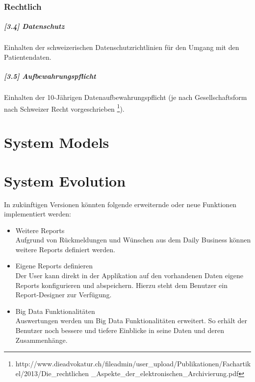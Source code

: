 \documentclass[a4paper]{scrreprt}
\begin{document}
\subsection{Rechtlich}
\paragraph{[3.4] Datenschutz} Einhalten der schweizerischen Datenschutzrichtlinien für den Umgang mit den Patientendaten.

\paragraph{[3.5] Aufbewahrungspflicht} Einhalten der 10-Jährigen Datenaufbewahrungspflicht (je nach Gesellschaftsform nach Schweizer Recht vorgeschrieben \footnote{http://www.dieadvokatur.ch/fileadmin/user\_upload/Publikationen/Fachartikel/2013/Die\_rechtlichen \_Aspekte\_der\_elektronischen\_Archivierung.pdf}).




\chapter{System Models}



\chapter{System Evolution}

In zukünftigen Versionen könnten folgende erweiternde oder neue Funktionen implementiert werden:
\begin{itemize}
\item Weitere Reports\\
Aufgrund von Rückmeldungen und Wünschen aus dem Daily Business können weitere Reports definiert werden.
\item Eigene Reports definieren\\
Der User kann direkt in der Applikation auf den vorhandenen Daten eigene Reports konfigurieren und abspeichern. Hierzu steht dem Benutzer ein Report-Designer zur Verfügung.
\item Big Data Funktionalitäten \\
Auswertungen werden um Big Data Funktionalitäten erweitert. So erhält der Benutzer noch bessere und tiefere Einblicke in seine Daten und deren Zusammenhänge.
\end{itemize}
\end{document}
